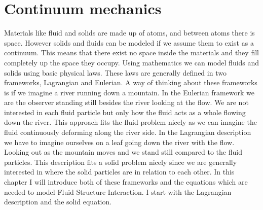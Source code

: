 \chapter{Continuum mechanics}
Materials like fluid and solids are made up of atoms, and between atoms there is space. However solids and fluids can be modeled if we assume them to exist as a continuum. This means that there exist no space inside the materials and they fill completely up the space they occupy. Using mathematics we can model fluids and solids using basic physical laws. These laws are generally defined in two frameworks, Lagrangian and Eulerian. A way of thinking about these frameworks is if we imagine a river running down a mountain. In the Eulerian framework we are the observer standing still besides the river looking at the flow. We are not interested in each fluid particle but only how the fluid acts as a whole flowing down the river. This approach fits the fluid problem nicely as we can imagine the fluid continuously deforming along the river side.\newline
In the Lagrangian description we have to imagine ourselves on a leaf going down the river with the flow. Looking out as the mountain moves and we stand still compared to the fluid particles. This description fits a solid problem nicely since we are generally interested in where the solid particles are in relation to each other.  
In this chapter I will introduce both of these frameworks and the equations which are needed to model Fluid Structure Interaction. I start with the Lagrangian description and the solid equation. 
%



